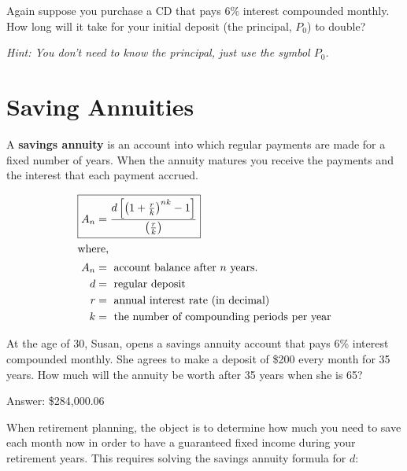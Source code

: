 \begin{exercise}
  Again suppose you purchase a CD that pays 6\% interest compounded
  monthly. How long will it take for your initial deposit (the
  principal, \(P_{0}\)) to double?

  \medskip

  \noindent\emph{Hint: You don't need to know the principal, just use
    the symbol \(P_{0}\).}

\end{exercise}

\newpage

\section{Saving Annuities}%
\label{sec:annuities}

\begin{definition}
  A \textbf{savings annuity} is an account into which regular payments
  are made for a fixed number of years. When the annuity matures you
  receive the payments and the interest that each payment accrued.

  \begin{align}
    \Aboxed{A_{n}
    &= \frac{d\left[ {\left( 1+\frac{r}{k} \right)}^{nk} - 1 \right]}
      {\left( \frac{r}{k} \right)}} \\
    \intertext{where,}
    A_{n} &= \text{ account balance after } n \text{ years.} \notag \\
    d &= \text{ regular deposit} \notag \\
    r &= \text{ annual interest rate (in decimal)} \notag \\
    k &= \text{ the number of compounding periods per year} \notag
  \end{align}
\end{definition}

\begin{exercise}
  At the age of 30, Susan, opens a savings annuity account that pays
  6\% interest compounded monthly. She agrees to make a deposit of
  \$200 every month for 35 years. How much will the annuity be worth
  after 35 years when she is 65?

  \noindent Answer: \$284,000.06
\end{exercise}

\newpage

When retirement planning, the object is to determine how much you need
to save each month now in order to have a guaranteed fixed income
during your retirement years. This requires solving the savings
annuity formula for \(d\):

